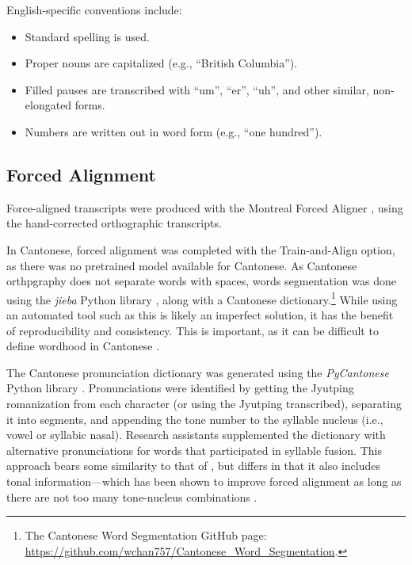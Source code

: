 English-specific conventions include:
\begin{itemize}
 \item Standard spelling is used.
 \item Proper nouns are capitalized (e.g., ``British Columbia''). 
 \item Filled pauses are transcribed with ``um'', ``er'', ``uh'', and other similar, non-elongated forms.
 \item Numbers are written out in word form (e.g., ``one hundred'').
\end{itemize}

\subsection{Forced Alignment}\label{ch2:subsec:alignment}
Force-aligned transcripts were produced with the Montreal Forced Aligner \citep{mcauliffe_2017_mfa}, using the hand-corrected orthographic transcripts. 

In Cantonese, forced alignment was completed with the Train-and-Align option, as there was no pretrained model available for Cantonese. As Cantonese orthpgraphy does not separate words with spaces, words segmentation was done using the \textit{jieba} Python library \citep{sun_2020_jieba}, along with a Cantonese dictionary.\footnote{The Cantonese Word Segmentation GitHub page: \url{https://github.com/wchan757/Cantonese_Word_Segmentation}.} While using an automated tool such as this is likely an imperfect solution, it has the benefit of reproducibility and consistency. This is important, as it can be difficult to define wordhood in Cantonese \citep[e.g., see][]{wong_2006_fusion}.

The Cantonese pronunciation dictionary was generated using the \textit{PyCantonese} Python library \citep{lee_2018_pycantonese}. Pronunciations were identified by getting the Jyutping romanization from each character (or using the Jyutping transcribed), separating it into segments, and appending the tone number to the syllable nucleus (i.e., vowel or syllabic nasal). Research assistants supplemented the dictionary with alternative pronunciations for words that participated in syllable fusion. This approach bears some similarity to that of \citet{tse_2019_heritage}, but differs in that it also includes tonal information---which has been shown to improve forced alignment as long as there are not too many tone-nucleus combinations \citep{cavar_2016_endangered, yuan_2014_automatic}. %

